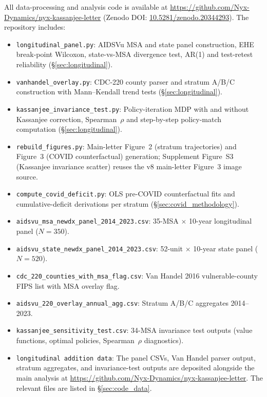 \documentclass[11pt]{article}
\begin{document}
All data-processing and analysis code is available at \url{https://github.com/Nyx-Dynamics/nyx-kassanjee-letter} (Zenodo DOI: \href{https://doi.org/10.5281/zenodo.20344293}{10.5281/zenodo.20344293}). The repository includes:
\begin{itemize}
\item \texttt{longitudinal\_panel.py}: AIDSVu MSA and state panel construction, EHE break-point Wilcoxon, state-vs-MSA divergence test, AR(1) and test-retest reliability (§\ref{sec:longitudinal}).
\item \texttt{vanhandel\_overlay.py}: CDC-220 county parser and stratum A/B/C construction with Mann--Kendall trend tests (§\ref{sec:longitudinal}).
\item \texttt{kassanjee\_invariance\_test.py}: Policy-iteration MDP with and without Kassanjee correction, Spearman~$\rho$ and step-by-step policy-match computation (§\ref{sec:longitudinal}).
\item \texttt{rebuild\_figures.py}: Main-letter Figure~2 (stratum trajectories) and Figure~3 (COVID counterfactual) generation; Supplement Figure~S3 (Kassanjee invariance scatter) reuses the v8 main-letter Figure~3 image source.
\item \texttt{compute\_covid\_deficit.py}: OLS pre-COVID counterfactual fits and cumulative-deficit derivations per stratum (§\ref{sec:covid_methodology}).
\item \texttt{aidsvu\_msa\_newdx\_panel\_2014\_2023.csv}: 35-MSA $\times$ 10-year longitudinal panel ($N = 350$).
\item \texttt{aidsvu\_state\_newdx\_panel\_2014\_2023.csv}: 52-unit $\times$ 10-year state panel ($N = 520$).
\item \texttt{cdc\_220\_counties\_with\_msa\_flag.csv}: Van Handel 2016 vulnerable-county FIPS list with MSA overlay flag.
\item \texttt{aidsvu\_220\_overlay\_annual\_agg.csv}: Stratum A/B/C aggregates 2014--2023.
\item \texttt{kassanjee\_sensitivity\_test.csv}: 34-MSA invariance test outputs (value functions, optimal policies, Spearman~$\rho$ diagnostics).
\item \texttt{longitudinal addition data}: The panel CSVs, Van Handel parser output, stratum aggregates, and invariance-test outputs are deposited alongside the main analysis at \url{https://github.com/Nyx-Dynamics/nyx-kassanjee-letter}. The relevant files are listed in §\ref{sec:code_data}. 
\end{itemize}
\end{document}
